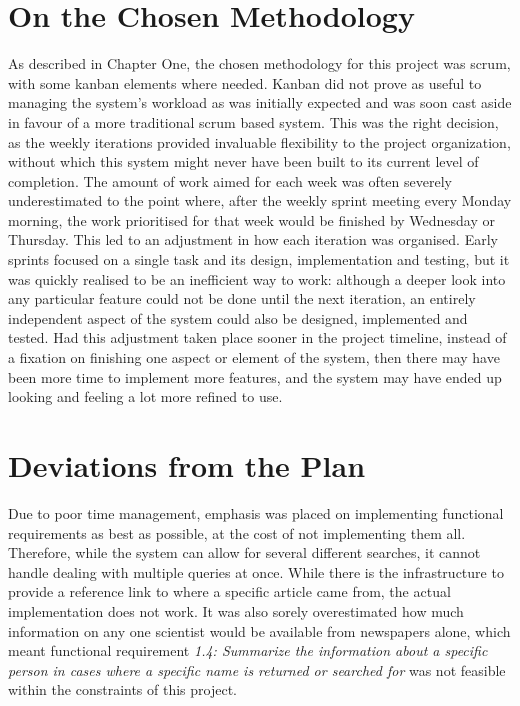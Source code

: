 \documentclass[11pt,a4paper]{book}
\begin{document}
\section{On the Chosen Methodology}
As described in Chapter One, the chosen methodology for this project was scrum, with some kanban elements where needed. Kanban did not prove as useful to managing the system's workload as was initially expected and was soon cast aside in favour of a more traditional scrum based system. This was the right decision, as the weekly iterations provided invaluable flexibility to the project organization, without which this system might never have been built to its current level of completion. The amount of work aimed for each week was often severely underestimated to the point where, after the weekly sprint meeting every Monday morning, the work prioritised for that week would be finished by Wednesday or Thursday. This led to an adjustment in how each iteration was organised. Early sprints focused on a single task and its design, implementation and testing, but it was quickly realised to be an inefficient way to work: although a deeper look into any particular feature could not be done until the next iteration, an entirely independent aspect of the system could also be designed, implemented and tested. Had this adjustment taken place sooner in the project timeline, instead of a fixation on finishing one aspect or element of the system, then there may have been more time to implement more features, and the system may have ended up looking and feeling a lot more refined to use. 

\section{Deviations from the Plan}
Due to poor time management, emphasis was placed on implementing functional requirements as best as possible, at the cost of not implementing them all. Therefore, while the system can allow for several different searches, it cannot handle dealing with multiple queries at once. While there is the infrastructure to provide a reference link to where a specific article came from, the actual implementation does not work. It was also sorely overestimated how much information on any one scientist would be available from newspapers alone, which meant functional requirement \textit{1.4: Summarize the information about a specific person in cases where a specific name is returned or searched for} was not feasible within the constraints of this project. 
\end{document}
